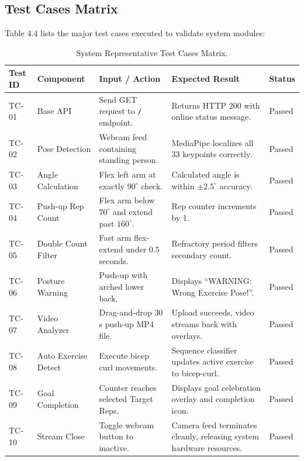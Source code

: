 \subsection{Test Cases Matrix}
Table 4.4 lists the major test cases executed to validate system modules:
\begin{table}[h]
\centering
\begin{tabular}{|p{1.4cm}|p{2.2cm}|p{4.8cm}|p{4.8cm}|p{1.4cm}|}
\hline
\textbf{Test ID} & \textbf{Component} & \textbf{Input / Action} & \textbf{Expected Result} & \textbf{Status} \\ \hline
TC-01 & Base API & Send GET request to \texttt{/} endpoint. & Returns HTTP 200 with online status message. & Passed \\ \hline
TC-02 & Pose Detection & Webcam feed containing standing person. & MediaPipe localizes all 33 keypoints correctly. & Passed \\ \hline
TC-03 & Angle Calculation & Flex left arm at exactly $90^{\circ}$ check. & Calculated angle is within $\pm 2.5^{\circ}$ accuracy. & Passed \\ \hline
TC-04 & Push-up Rep Count & Flex arm below $70^{\circ}$ and extend past $160^{\circ}$. & Rep counter increments by 1. & Passed \\ \hline
TC-05 & Double Count Filter & Fast arm flex-extend under $0.5$ seconds. & Refractory period filters secondary count. & Passed \\ \hline
TC-06 & Posture Warning & Push-up with arched lower back. & Displays ``WARNING: Wrong Exercise Pose!''. & Passed \\ \hline
TC-07 & Video Analyzer & Drag-and-drop $30$s push-up MP4 file. & Upload succeeds, video streams back with overlays. & Passed \\ \hline
TC-08 & Auto Exercise Detect & Execute bicep curl movements. & Sequence classifier updates active exercise to bicep-curl. & Passed \\ \hline
TC-09 & Goal Completion & Counter reaches selected Target Reps. & Displays goal celebration overlay and completion icon. & Passed \\ \hline
TC-10 & Stream Close & Toggle webcam button to inactive. & Camera feed terminates cleanly, releasing system hardware resources. & Passed \\ \hline
\end{tabular}
\caption{System Representative Test Cases Matrix.}
\label{tab:test_cases}
\end{table}
\newpage
